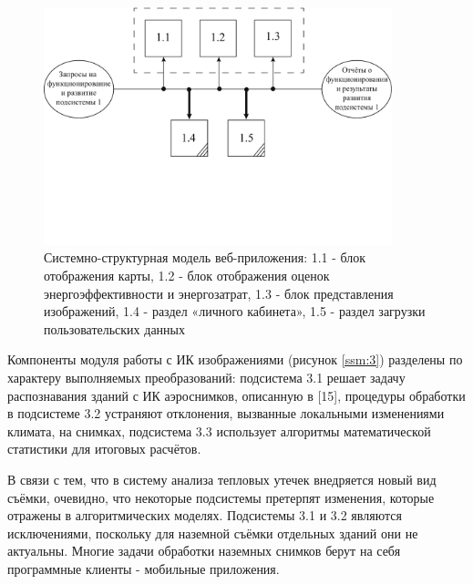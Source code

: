 \pagebreak

	\begin{figure}[t!]
      \centering
      \includegraphics[width=0.9\textwidth]{images/ssm/1}
      \caption{Системно-структурная модель веб-приложения: 1.1 - блок отображения карты, 1.2 - блок отображения оценок энергоэффективности и энергозатрат, 1.3 - блок представления изображений, 1.4 - раздел «личного кабинета», 1.5 - раздел загрузки пользовательских данных}
      \label{ssm:1}
    \end{figure}

\par
	Компоненты модуля работы с ИК изображениями (рисунок \ref{ssm:3}) разделены по характеру выполняемых преобразований: подсистема 3.1 решает задачу распознавания зданий с ИК аэроснимков, описанную в [15], процедуры обработки в подсистеме 3.2 устраняют отклонения, вызванные локальными изменениями климата, на снимках, подсистема 3.3 использует алгоритмы математической статистики для итоговых расчётов.

\pagebreak

	В связи с тем, что в систему анализа тепловых утечек внедряется новый вид съёмки, очевидно, что некоторые подсистемы претерпят изменения, которые отражены в алгоритмических моделях. Подсистемы 3.1 и 3.2 являются исключениями, поскольку для наземной съёмки отдельных зданий они не актуальны. Многие задачи обработки наземных снимков берут на себя программные клиенты - мобильные приложения.

